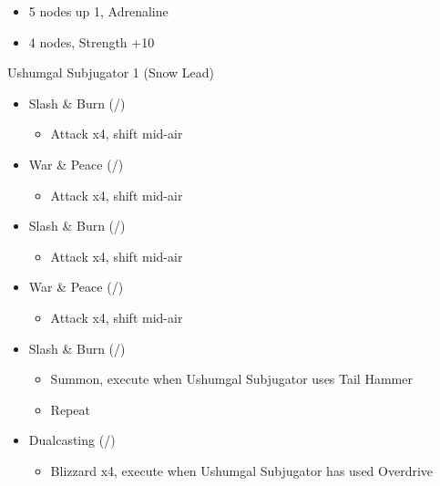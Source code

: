 \begin{multicols}{2}
\begin{menu}
\begin{itemize}
\begin{itemize}
\begin{itemize}
                      \begin{itemize}
                        \item 5 nodes up 1, Adrenaline
                        \item 4 nodes, Strength +10
                      \end{itemize}
              \end{itemize}
      \end{itemize}
    \end{itemize}
  \end{menu}
  \renewcommand{\first}{[1] Slash \& Burn (\com/\rav)}
  \renewcommand{\second}{[2] War \& Peace (\com/\med)}
  \renewcommand{\fifth}{[5] Dualcasting (\rav/\rav)}
  \renewcommand{\sixth}{[6] Dualcasting (\rav/\rav)}
  \begin{battle}{Ushumgal Subjugator 1 (Snow Lead)}
    \begin{itemize}
      \item \first
            \begin{itemize}
              \item Attack x4, shift mid-air
            \end{itemize}
      \item \second
            \begin{itemize}
              \item Attack x4, shift mid-air
            \end{itemize}
      \item \first
            \begin{itemize}
              \item Attack x4, shift mid-air
            \end{itemize}
      \item \second
            \begin{itemize}
              \item Attack x4, shift mid-air
            \end{itemize}
      \item \first
            \begin{itemize}
              \item Summon, execute when Ushumgal Subjugator uses Tail Hammer
              \item Repeat
            \end{itemize}
      \item \fifth
            \begin{itemize}
              \item Blizzard x4, execute when Ushumgal Subjugator has used Overdrive

\end{itemize}
\end{itemize}
\end{battle}
\end{multicols}
